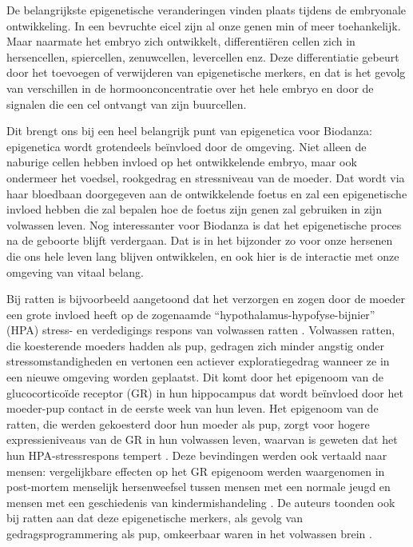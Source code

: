 \documentclass[
  11pt,
]{book}
\begin{document}
De belangrijkste epigenetische veranderingen vinden plaats tijdens de embryonale ontwikkeling. In een bevruchte eicel zijn al onze genen min of meer toehankelijk. Maar naarmate het embryo zich ontwikkelt, differentiëren cellen zich in hersencellen, spiercellen, zenuwcellen, levercellen enz. Deze differentiatie gebeurt door het toevoegen of verwijderen van epigenetische merkers, en dat is het gevolg van verschillen in de hormoonconcentratie over het hele embryo en door de signalen die een cel ontvangt van zijn buurcellen.

Dit brengt ons bij een heel belangrijk punt van epigenetica voor Biodanza: epigenetica wordt grotendeels beïnvloed door de omgeving. Niet alleen de naburige cellen hebben invloed op het ontwikkelende embryo, maar ook ondermeer het voedsel, rookgedrag en stressniveau van de moeder. Dat wordt via haar bloedbaan doorgegeven aan de ontwikkelende foetus en zal een epigenetische invloed hebben die zal bepalen hoe de foetus zijn genen zal gebruiken in zijn volwassen leven. Nog interessanter voor Biodanza is dat het epigenetische proces na de geboorte blijft verdergaan. Dat is in het bijzonder zo voor onze hersenen die ons hele leven lang blijven ontwikkelen, en ook hier is de interactie met onze omgeving van vitaal belang.

Bij ratten is bijvoorbeeld aangetoond dat het verzorgen en zogen door de moeder een grote invloed heeft op de zogenaamde ``hypothalamus-hypofyse-bijnier'' (HPA) stress- en verdedigings respons van volwassen ratten \citep{Meaney2004}. Volwassen ratten, die koesterende moeders hadden als pup, gedragen zich minder angstig onder stressomstandigheden en vertonen een actiever exploratiegedrag wanneer ze in een nieuwe omgeving worden geplaatst. Dit komt door het epigenoom van de glucocorticoïde receptor (GR) in hun hippocampus dat wordt beïnvloed door het moeder-pup contact in de eerste week van hun leven. Het epigenoom van de ratten, die werden gekoesterd door hun moeder als pup, zorgt voor hogere expressieniveaus van de GR in hun volwassen leven, waarvan is geweten dat het hun HPA-stressrespons tempert \citep{Meaney2004, Meaney2005}. Deze bevindingen werden ook vertaald naar mensen: vergelijkbare effecten op het GR epigenoom werden waargenomen in post-mortem menselijk hersenweefsel tussen mensen met een normale jeugd en mensen met een geschiedenis van kindermishandeling \citep{Meaney2009}. De auteurs toonden ook bij ratten aan dat deze epigenetische merkers, als gevolg van gedragsprogrammering als pup, omkeerbaar waren in het volwassen brein \citep{Meaney2005}.
\end{document}
